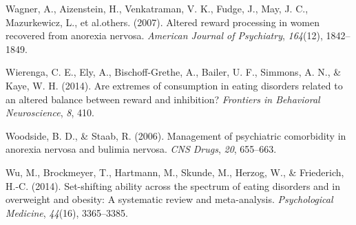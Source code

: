 \documentclass[
  man,floatsintext]{apa6}
\newlength{\cslhangindent}
\newlength{\cslentryspacingunit} %
\newenvironment{CSLReferences}[2] %
 {%
  \setlength{\parindent}{0pt}
  \ifodd #1
  \let\oldpar\par
  \def\par{\hangindent=\cslhangindent\oldpar}
  \fi
  \setlength{\parskip}{#2\cslentryspacingunit}
 }%
 {}
\begin{document}
\begin{CSLReferences}{1}{0}
\leavevmode{}%
Wagner, A., Aizenstein, H., Venkatraman, V. K., Fudge, J., May, J. C., Mazurkewicz, L., et al.others. (2007). Altered reward processing in women recovered from anorexia nervosa. \emph{American Journal of Psychiatry}, \emph{164}(12), 1842--1849.

\leavevmode{}%
Wierenga, C. E., Ely, A., Bischoff-Grethe, A., Bailer, U. F., Simmons, A. N., \& Kaye, W. H. (2014). Are extremes of consumption in eating disorders related to an altered balance between reward and inhibition? \emph{Frontiers in Behavioral Neuroscience}, \emph{8}, 410.

\leavevmode{}%
Woodside, B. D., \& Staab, R. (2006). Management of psychiatric comorbidity in anorexia nervosa and bulimia nervosa. \emph{CNS Drugs}, \emph{20}, 655--663.

\leavevmode{}%
Wu, M., Brockmeyer, T., Hartmann, M., Skunde, M., Herzog, W., \& Friederich, H.-C. (2014). Set-shifting ability across the spectrum of eating disorders and in overweight and obesity: A systematic review and meta-analysis. \emph{Psychological Medicine}, \emph{44}(16), 3365--3385.

\end{CSLReferences}
\end{document}
